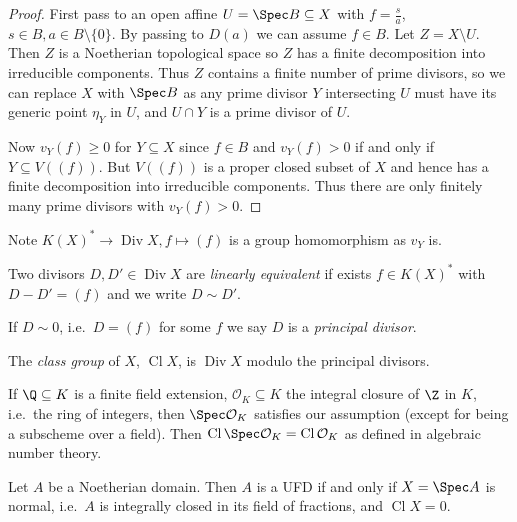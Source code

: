 \documentclass[a4paper]{article}
\newcommand{\sh}[1]{\mathcal{#1}} %
\DeclareMathOperator{\Div}{Div} %
\DeclareMathOperator{\Cl}{Cl} %
\begin{document}
\begin{proof}
  First pass to an open affine \(U = \Spec B \subseteq X\) with \(f = \frac{s}{a}\), \(s \in B, a \in B\setminus \{0\}\). By passing to \(D(a)\) we can assume \(f \in B\). Let \(Z = X \setminus U\). Then \(Z\) is a Noetherian topological space so \(Z\) has a finite decomposition into irreducible components. Thus \(Z\) contains a finite number of prime divisors, so we can replace \(X\) with \(\Spec B\) as any prime divisor \(Y\) intersecting \(U\) must have its generic point \(\eta_Y\) in \(U\), and \(U \cap Y\) is a prime divisor of \(U\).

  Now \(v_Y(f) \geq 0\) for \(Y \subseteq X\) since \(f \in B\) and \(v_Y(f) > 0\) if and only if \(Y \subseteq V((f))\). But \(V((f))\) is a proper closed subset of \(X\) and hence has a finite decomposition into irreducible components. Thus there are only finitely many prime divisors with \(v_Y(f) > 0\).
\end{proof}

Note \(K(X)^* \to \Div X, f \mapsto (f)\) is a group homomorphism as \(v_Y\) is.

\begin{definition}
  Two divisors \(D, D' \in \Div X\) are \emph{linearly equivalent} if exists \(f \in K(X)^*\) with \(D - D' = (f)\) and we write \(D \sim D'\).

  If \(D \sim 0\), i.e.\ \(D = (f)\) for some \(f\) we say \(D\) is a \emph{principal divisor}.
\end{definition}

\begin{definition}
  The \emph{class group} of \(X\), \(\Cl X\), is \(\Div X\) modulo the principal divisors.
\end{definition}

\begin{remark}
  If \(\Q \subseteq K\) is a finite field extension, \(\sh O_K \subseteq K\) the integral closure of \(\Z\) in \(K\), i.e.\ the ring of integers, then \(\Spec \sh O_K\) satisfies our assumption (except for being a subscheme over a field). Then \(\Cl \Spec \sh O_K = \Cl \sh O_K\) as defined in algebraic number theory.
\end{remark}

\begin{theorem}
  Let \(A\) be a Noetherian domain. Then \(A\) is a UFD if and only if \(X = \Spec A\) is normal, i.e.\ \(A\) is integrally closed in its field of fractions, and \(\Cl X = 0\).
\end{theorem}
\end{document}
